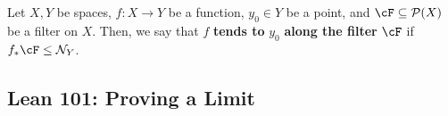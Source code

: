 \begin{definition}
  Let \(X, Y\) be spaces, \(f : X \to Y\) be a function, \(y_0 \in Y\) be a point, and \(\cF \subseteq \mathcal{P}(X)\) be a filter on \(X\). Then, we say that \(f\) \textbf{tends to} \(y_0\) \textbf{along the filter} \(\cF\) if \(f_*\cF \leq \mathcal{N}_Y\).
\end{definition}



\subsection{Lean 101: Proving a Limit}

